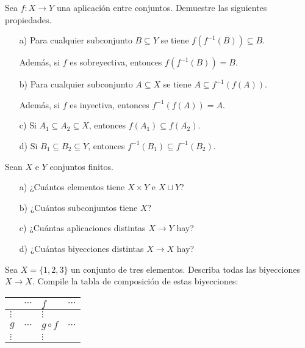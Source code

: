 \begin{ejercicio}
  Sea $f\colon X\to Y$ una aplicación entre conjuntos. Demuestre las siguientes
  propiedades.

  \begin{enumerate}
  \item[a)] Para cualquier subconjunto $B \subseteq Y$ se tiene
    $f (f^{-1} (B)) \subseteq B$.

    Además, si $f$ es sobreyectiva, entonces $f (f^{-1} (B)) = B$.

  \item[b)] Para cualquier subconjunto $A \subseteq X$ se tiene
    $A \subseteq f^{-1} (f (A))$.

    Además, si $f$ es inyectiva, entonces $f^{-1} (f (A)) = A$.

  \item[c)] Si $A_1 \subseteq A_2 \subseteq X$, entonces
    $f (A_1) \subseteq f (A_2)$.

  \item[d)] Si $B_1 \subseteq B_2 \subseteq Y$, entonces
    $f^{-1} (B_1) \subseteq f^{-1} (B_2)$.
  \end{enumerate}
\end{ejercicio}

\begin{ejercicio}
  Sean $X$ e $Y$ conjuntos finitos.

  \begin{enumerate}
  \item[a)] ¿Cuántos elementos tiene $X\times Y$ e $X\sqcup Y$?

  \item[b)] ¿Cuántos subconjuntos tiene $X$?

  \item[c)] ¿Cuántas aplicaciones distintas $X\to Y$ hay?

  \item[d)] ¿Cuántas biyecciones distintas $X\to X$ hay?
  \end{enumerate}
\end{ejercicio}

\begin{ejercicio}
  Sea $X = \{ 1,2,3 \}$ un conjunto de tres elementos. Describa todas las
  biyecciones $X\to X$. Compile la tabla de composición de estas biyecciones:
  \begin{center}
    \begin{tabular}{x{1cm}|x{1cm}x{1cm}x{1cm}}
      & $\cdots$ & $f$ & $\cdots$ \tabularnewline
      \hline
      $\vdots$ & & $\vdots$ \tabularnewline
      $g$ & $\cdots$ & $g\circ f$ & $\cdots$ \tabularnewline
      $\vdots$ & & $\vdots$ \tabularnewline
    \end{tabular}
  \end{center}
\end{ejercicio}

